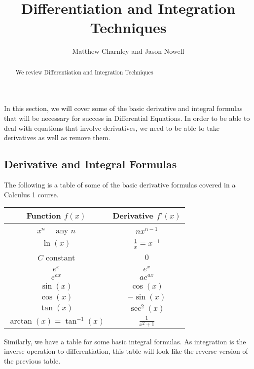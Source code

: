 \documentclass{ximera}
\title{Differentiation and Integration Techniques}
\author{Matthew Charnley and Jason Nowell}
\begin{document}
\begin{abstract}
    We review Differentiation and Integration Techniques
\end{abstract}
\maketitle

\label{sec:derivInt}

In this section, we will cover some of the basic derivative and integral formulas that will be necessary for success in Differential Equations. In order to be able to deal with equations that involve derivatives, we need to be able to take derivatives as well as remove them.

\subsection{Derivative and Integral Formulas}

The following is a table of some of the basic derivative formulas covered in a Calculus 1 course.

\begin{center}
    \begin{tabular}{|c|c|}\hline
        \textbf{Function $f(x)$} & \textbf{Derivative $f'(x)$} \\ \hline
        $x^n$ \ \ any $n$ & $nx^{n-1}$ \\ \hline
        $\ln(x)$ & $\frac{1}{x} = x^{-1}$ \\ \hline
        $C$ constant & $0$ \\ \hline
        $e^x$ & $e^x$ \\ \hline
        $e^{ax}$ & $ae^{ax}$ \\ \hline
        $\sin(x)$ & $\cos(x)$ \\ \hline
        $\cos(x)$ & $-\sin(x)$ \\ \hline
        $\tan(x)$ & $\sec^2(x)$ \\ \hline
        $\arctan(x) = \tan^{-1}(x)$ & $\frac{1}{x^2 + 1}$ \\ \hline
    \end{tabular}
\end{center}

Similarly, we have a table for some basic integral formulas. As integration is the inverse operation to differentiation, this table will look like the reverse version of the previous table.
\end{document}
